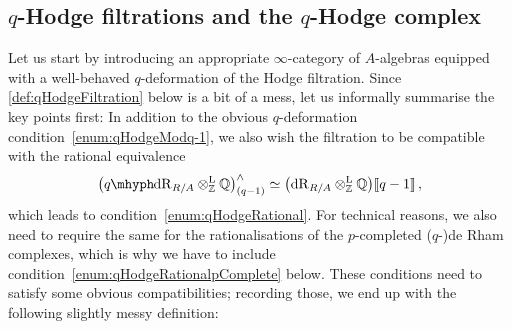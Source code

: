 \documentclass[DIV=12,numbers=enddot,leqno,bibliography=totoc]{scrartcl}
\begin{document}
	
	\subsection{\texorpdfstring{$q$}{q}-Hodge filtrations and the \texorpdfstring{$q$}{q}-Hodge complex}\label{subsec:qHodgeFiltrations}
	
	Let us start by introducing an appropriate $\infty$-category of $A$-algebras equipped with a well-behaved $q$-deformation of the Hodge filtration. Since \cref{def:qHodgeFiltration} below is a bit of a mess, let us informally summarise the key points first: In addition to the obvious $q$-deformation condition~\cref{enum:qHodgeModq-1}, we also wish the filtration to be compatible with the rational equivalence
	\begin{equation*}
		\bigl(\qdeRham_{R/A}\lotimes_\IZ\IQ\bigr)_{(q-1)}^\complete\simeq \bigl(\deRham_{R/A}\lotimes_\IZ\IQ\bigr)\qpower\,,
	\end{equation*}
	which leads to condition~\cref{enum:qHodgeRational}. For technical reasons, we also need to require the same for the rationalisations of the $p$-completed ($q$-)de Rham complexes, which is why we have to include condition~\cref{enum:qHodgeRationalpComplete} below. These conditions need to satisfy some obvious compatibilities; recording those, we end up with the following slightly messy definition: 
	
\end{document}
